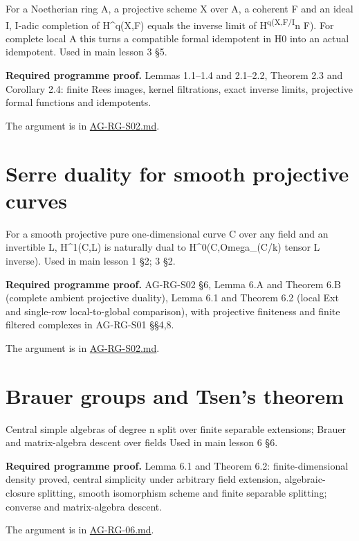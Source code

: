 \documentclass[11pt,a4paper,openany]{report}
\begin{document}
For a Noetherian ring A, a projective scheme X over A, a coherent F and an ideal I, I-adic completion of H\^{}q(X,F) equals the inverse limit of H\textsuperscript{q(X,F/I}n F). For complete local A this turns a compatible formal idempotent in H0 into an actual idempotent. Used in main lesson 3 §5.

\textbf{Required programme proof.} Lemmas 1.1--1.4 and 2.1--2.2, Theorem 2.3 and Corollary 2.4: finite Rees images, kernel filtrations, exact inverse limits, projective formal functions and idempotents.

The argument is in \href{https://github.com/KokunoYumeto/open-math-courses/blob/main/docs/courses/AG-RG/AG-RG-S02.md}{AG-RG-S02.md}.

\section{Serre duality for smooth projective curves}\label{serre-duality-for-smooth-projective-curves}

For a smooth projective pure one-dimensional curve C over any field and an invertible L, H\^{}1(C,L) is naturally dual to H\^{}0(C,Omega\_(C/k) tensor L inverse). Used in main lesson 1 §2; 3 §2.

\textbf{Required programme proof.} AG-RG-S02 §6, Lemma 6.A and Theorem 6.B (complete ambient projective duality), Lemma 6.1 and Theorem 6.2 (local Ext and single-row local-to-global comparison), with projective finiteness and finite filtered complexes in AG-RG-S01 §§4,8.

The argument is in \href{https://github.com/KokunoYumeto/open-math-courses/blob/main/docs/courses/AG-RG/AG-RG-S02.md}{AG-RG-S02.md}.

\section{Brauer groups and Tsen's theorem}\label{brauer-groups-and-tsens-theorem}

Central simple algebras of degree n split over finite separable extensions; Brauer and matrix-algebra descent over fields Used in main lesson 6 §6.

\textbf{Required programme proof.} Lemma 6.1 and Theorem 6.2: finite-dimensional density proved, central simplicity under arbitrary field extension, algebraic-closure splitting, smooth isomorphism scheme and finite separable splitting; converse and matrix-algebra descent.

The argument is in \href{https://github.com/KokunoYumeto/open-math-courses/blob/main/docs/courses/AG-RG/AG-RG-06.md}{AG-RG-06.md}.
\end{document}
